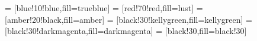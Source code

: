 

 = [blue!10!blue,fill=trueblue]
 = [red!70!red,fill=lust]
 = [amber!20!black,fill=amber]
 = [black!30!kellygreen,fill=kellygreen]
 = [black!30!darkmagenta,fill=darkmagenta]
 = [black!30,fill=black!30]
